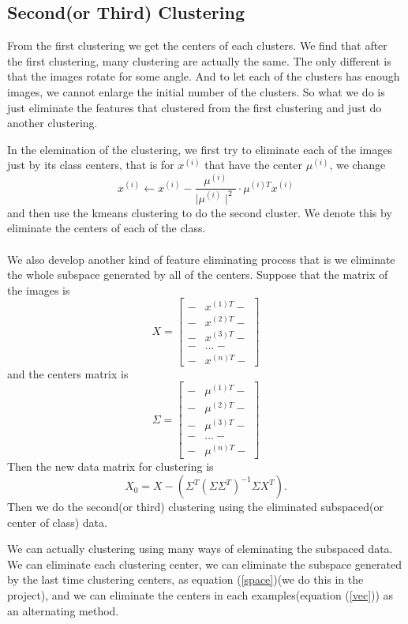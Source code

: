 \documentclass{article}
\begin{document}
\subsection{Second(or Third) Clustering}
	From the first clustering we get the centers of each clusters. We find that after the first clustering, many clustering are actually the same. The only different is that the images rotate for some angle. And to let each of the clusters has enough images, we cannot enlarge the initial number of the clusters. So what we do is just eliminate the features that clustered from the first clustering and just do another clustering.\par
	In the elemination of the clustering, we first try to eliminate each of the images just by its class centers, that is for $x^{(i)}$ that have the center $\mu^{(i)}$, we change
	\begin{equation}\label{vec}
		x^{(i)} \leftarrow x^{(i)} - \frac{\mu^{(i)}}{\mid \mu^{(i)}\mid^2}\cdot \mu^{(i)T}x^{(i)}
	\end{equation}
and then use the kmeans clustering to do the second cluster. We denote this by eliminate the centers of each of the class.\\
~\\
We also develop another kind of feature eliminating process that is we eliminate the whole subspace generated by all of the centers. Suppose that the matrix of the images is
\begin{equation*}
	X = \left[
	\begin{aligned}
		-&x^{(1)T}-\\
		-&x^{(2)T}-\\
		-&x^{(3)T}-\\
		-&\dots-\\
		-&x^{(n)T}-
	\end{aligned}\right]
\end{equation*}
and the centers matrix is
\begin{equation*}
	\Sigma = \left[
	\begin{aligned}
	-&\mu^{(1)T}-\\
	-&\mu^{(2)T}-\\
	-&\mu^{(3)T}-\\
	-&\dots-\\
	-&\mu^{(n)T}-
	\end{aligned}\right]
\end{equation*}
Then the new data matrix for clustering is
\begin{equation}\label{space}
	X_0 = X - (\Sigma^T(\Sigma\Sigma^T)^{-1}\Sigma X^T).
\end{equation}
Then we do the second(or third) clustering using the eliminated subspaced(or center of class) data.\par
We can actually clustering using many ways of eleminating the subspaced data. We can eliminate each clustering center, we can eliminate the subspace generated by the last time clustering centers, as equation (\ref{space})(we do this in the project), and we can eliminate the centers in each examples(equation (\ref{vec})) as an alternating method.
\end{document}
